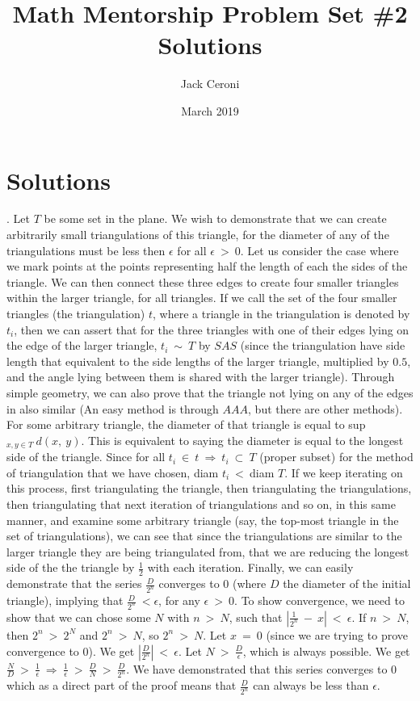 \documentclass{article}
\title{Math Mentorship Problem Set \#2 Solutions}
\author{Jack Ceroni}
\date{March 2019}
\begin{document}
\maketitle
\newpage
\section{Solutions}
. Let $T$ be some set in the plane. We wish to demonstrate that we can create arbitrarily small triangulations of this triangle, for the diameter of any of the triangulations must be less then $\epsilon$ for all $\epsilon \ > \ 0$. Let us consider the case where we mark points at the points representing half the length of each the sides of the triangle. We can then connect these three edges to create four smaller triangles within the larger triangle, for all triangles. If we call the set of the four smaller triangles (the triangulation) $t$, where a triangle in the triangulation is denoted by $t_i$, then we can assert that for the three triangles with one of their edges lying on the edge of the larger triangle, $t_i \ \sim \ T$ by $SAS$ (since the triangulation have side length that equivalent to the side lengths of the larger triangle, multiplied by $0.5$, and the angle lying between them is shared with the larger triangle). Through simple geometry, we can also prove that the triangle not lying on any of the edges in also similar (An easy method is through $AAA$, but there are other methods).
\newline\newline
For some arbitrary triangle, the diameter of that triangle is equal to sup$_{x, y \in T} \ d(x, \ y)$. This is equivalent to saying the diameter is equal to the longest side of the triangle. Since for all $t_i \ \in \ t \ \Rightarrow \ t_i \ \subset \ T$ (proper subset) for the method of triangulation that we have chosen, diam $t_i \ < \ $diam $T$. If we keep iterating on this process, first triangulating the triangle, then triangulating the triangulations, then triangulating that next iteration of triangulations and so on, in this same manner, and examine some arbitrary triangle (say, the top-most triangle in the set of triangulations), we can see that since the triangulations are similar to the larger triangle they are being triangulated from, that we are reducing the longest side of the the triangle by $\frac{1}{2}$ with each iteration.
\newline\newline
Finally, we can easily demonstrate that the series $\frac{D}{2^n}$ converges to $0$ (where $D$ the diameter of the initial triangle), implying that $\frac{D}{2^n} \ < \epsilon$, for any $\epsilon \ > \ 0$. To show convergence, we need to show that we can chose some $N$ with $n \ > \ N$, such that $|\frac{1}{2^n} \ - \ x| \ < \ \epsilon$. If $n \ > \ N$, then $2^n \ > \ 2^N$ and $2^n \ > \ N$, so $2^n \ > \ N$. Let $x \ = \ 0$ (since we are trying to prove convergence to $0$). We get $|\frac{D}{2^n}| \ < \ \epsilon$. Let $N \ > \ \frac{D}{\epsilon}$, which is always possible. We get $\frac{N}{D} \ > \ \frac{1}{\epsilon} \ \Rightarrow \ \frac{1}{\epsilon} \ > \ \frac{D}{N} \ > \ \frac{D}{2^n}$. We have demonstrated that this series converges to $0$ which as a direct part of the proof means that $\frac{D}{2^n}$ can always be less than $\epsilon$.
\end{document}
